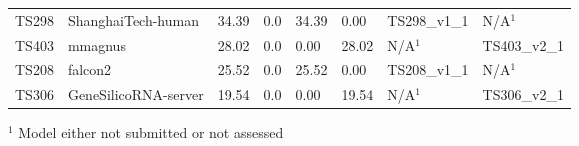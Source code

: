 \begin{table}[ht]
{\begin{tabular}{llllllll}
TS298 & ShanghaiTech-human & 34.39 & 0.0 & 34.39 & 0.00 & TS298\_v1\_1 & N/A$^{1}$ \\ 
TS403 & mmagnus & 28.02 & 0.0 & 0.00 & 28.02 & N/A$^{1}$ & TS403\_v2\_1 \\ 
TS208 & falcon2 & 25.52 & 0.0 & 25.52 & 0.00 & TS208\_v1\_1 & N/A$^{1}$ \\ 
TS306 & GeneSilicoRNA-server & 19.54 & 0.0 & 0.00 & 19.54 & N/A$^{1}$ & TS306\_v2\_1 \\ 
\bottomrule
\end{tabular}%
}
\begin{flushleft}\footnotesize $^{1}$ Model either not submitted or not assessed\end{flushleft}
\end{table}
